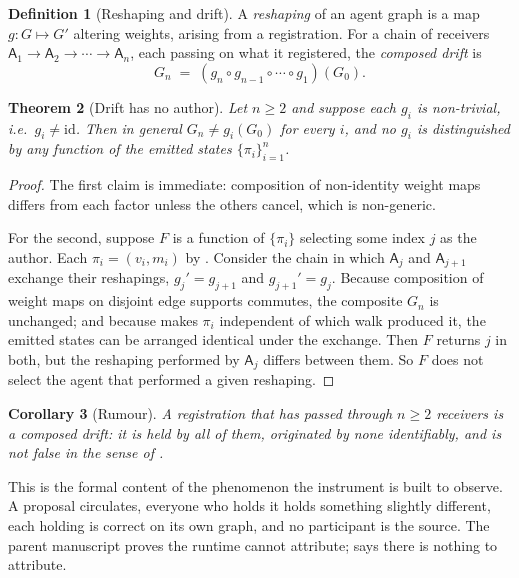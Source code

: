 \documentclass[11pt,a4paper]{article}
\theoremstyle{clstyle}
\newtheorem{theorem}{Theorem}[section]
\newtheorem{corollary}[theorem]{Corollary}
\theoremstyle{definition}
\newtheorem{definition}[theorem]{Definition}
\theoremstyle{remark}
\newcommand{\Ag}{\mathsf{A}}
\newcommand{\rec}{m}
\newcommand{\term}{v}                    %
\begin{document}
\begin{definition}[Reshaping and drift]
\label{def:drift}
A \emph{reshaping} of an agent graph is a map $g:G\mapsto G'$ altering
weights, arising from a registration. For a chain of receivers
$\Ag_1\to\Ag_2\to\cdots\to\Ag_n$, each passing on what it registered, the
\emph{composed drift} is
\begin{equation}
G_n \;=\; (g_n\circ g_{n-1}\circ\cdots\circ g_1)(G_0).
\end{equation}
\end{definition}

\begin{theorem}[Drift has no author]
\label{thm:drift}
Let $n\ge2$ and suppose each $g_i$ is non-trivial, i.e.\ $g_i\neq\mathrm{id}$.
Then in general $G_n\neq g_i(G_0)$ for every $i$, and no $g_i$ is
distinguished by any function of the emitted states
$\{\pi_i\}_{i=1}^{n}$.
\end{theorem}

\begin{proof}
The first claim is immediate: composition of non-identity weight maps
differs from each factor unless the others cancel, which is non-generic.

For the second, suppose $F$ is a function of $\{\pi_i\}$ selecting some
index $j$ as the author. Each $\pi_i=(\term_i,\rec_i)$ by
. Consider the chain in which $\Ag_j$ and $\Ag_{j+1}$
exchange their reshapings, $g_j'=g_{j+1}$ and $g_{j+1}'=g_j$. Because
composition of weight maps on disjoint edge supports commutes, the composite
$G_n$ is unchanged; and because  makes $\pi_i$ independent
of which walk produced it, the emitted states can be arranged identical
under the exchange. Then $F$ returns $j$ in both, but the reshaping
performed by $\Ag_j$ differs between them. So $F$ does not select the agent
that performed a given reshaping.
\end{proof}

\begin{corollary}[Rumour]
\label{cor:rumour}
A registration that has passed through $n\ge2$ receivers is a composed
drift: it is held by all of them, originated by none identifiably, and is
not false in the sense of .
\end{corollary}

This is the formal content of the phenomenon the instrument is built to
observe. A proposal circulates, everyone who holds it holds something
slightly different, each holding is correct on its own graph, and no
participant is the source. The parent manuscript proves the runtime cannot
attribute;  says there is nothing to attribute.
\end{document}
